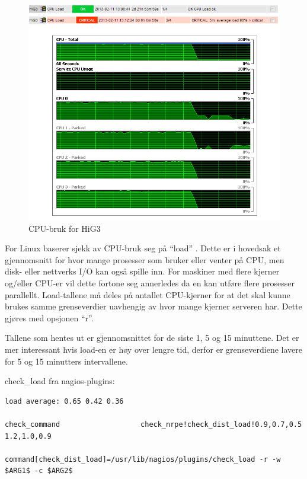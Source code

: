 \begin{figure}[H]
    \centering
    \includegraphics[scale=0.6]{img/cpu_test_hig3}
    \caption{CPU-bruk for HiG3}
    \label{cpustrain}
\end{figure}


For Linux baserer sjekk av CPU-bruk seg på “load” \cite{loadavg} \cite{wiki:loadavg}. Dette er i hovedsak et gjennomsnitt for hvor mange prosesser som bruker eller venter på CPU, men disk- eller nettverks I/O kan også spille inn. For maskiner med flere kjerner og/eller CPU-er vil dette fortone seg annerledes da en kan utføre flere prosesser parallellt. Load-tallene må deles på antallet CPU-kjerner for at det skal kunne brukes samme grenseverdier uavhengig av hvor mange kjerner serveren har. Dette gjøres med opsjonen “r”.

Tallene som hentes ut er gjennomsnittet for de siste 1, 5 og 15 minuttene. Det er mer interessant hvis load-en er høy over lengre tid, derfor er grenseverdiene lavere for 5 og 15 minutters intervallene.

check\_load fra nagios-plugins:
\begin{lstlisting}
load average: 0.65 0.42 0.36

check_command                   check_nrpe!check_dist_load!0.9,0.7,0.5 1.2,1.0,0.9

command[check_dist_load]=/usr/lib/nagios/plugins/check_load -r -w $ARG1$ -c $ARG2$
\end{lstlisting}

